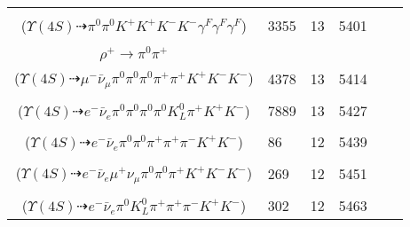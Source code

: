 \documentclass[landscape]{article}
\newcounter{rownumbers}
\newcommand\rn{\stepcounter{rownumbers}\arabic{rownumbers}}
\newcommand{\EOL}{\\} %
\newcommand{\topoTags}[1]{#1} %
\begin{document}
\begin{longtable}{clcccc}
\rn & \makecell[l]{ $ 
\Upsilon(4S) \rightarrow B^{0} B^{0} ,
B^{0} \rightarrow \pi^{0} K^{+} K^{-} \gamma^{F} ,
B^{0} \rightarrow \pi^{0} K^{+} K^{-} \gamma^{F} \gamma^{F} 
$ \\ ($
\Upsilon(4S) \dashrightarrow \pi^{0} \pi^{0} K^{+} K^{+} K^{-} K^{-} \gamma^{F} \gamma^{F} \gamma^{F} 
$) } & \topoTags{3355 & }13 & 5401 \EOL

\rn & \makecell[l]{ $ 
\Upsilon(4S) \rightarrow B^{0} \bar{B}^{0} ,
B^{0} \rightarrow \pi^{0} K^{+} K^{-} ,
\bar{B}^{0} \rightarrow \mu^{-} \bar{\nu}_{\mu} D^{*+} ,
D^{*+} \rightarrow \pi^{+} D^{0} ,
D^{0} \rightarrow K^{-} a_{1}^{+} ,
a_{1}^{+} \rightarrow \pi^{0} \rho^{+} ,
$ \\ $
\rho^{+} \rightarrow \pi^{0} \pi^{+} 
$ \\ ($
\Upsilon(4S) \dashrightarrow \mu^{-} \bar{\nu}_{\mu} \pi^{0} \pi^{0} \pi^{0} \pi^{+} \pi^{+} K^{+} K^{-} K^{-} 
$) } & \topoTags{4378 & }13 & 5414 \EOL

\rn & \makecell[l]{ $ 
\Upsilon(4S) \rightarrow B^{0} \bar{B}^{0} ,
B^{0} \rightarrow \pi^{0} K^{+} K^{-} ,
\bar{B}^{0} \rightarrow e^{-} \bar{\nu}_{e} D^{*+} ,
D^{*+} \rightarrow \pi^{+} D^{0} ,
D^{0} \rightarrow \pi^{0} \pi^{0} \pi^{0} K_{L}^{0} 
$ \\ ($
\Upsilon(4S) \dashrightarrow e^{-} \bar{\nu}_{e} \pi^{0} \pi^{0} \pi^{0} \pi^{0} K_{L}^{0} \pi^{+} K^{+} K^{-} 
$) } & \topoTags{7889 & }13 & 5427 \EOL

\rn & \makecell[l]{ $ 
\Upsilon(4S) \rightarrow B^{0} \bar{B}^{0} ,
B^{0} \rightarrow \pi^{0} K^{+} K^{-} ,
\bar{B}^{0} \rightarrow e^{-} \bar{\nu}_{e} D^{+} ,
D^{+} \rightarrow \pi^{0} \pi^{+} K_{S}^{0} ,
K_{S}^{0} \rightarrow \pi^{+} \pi^{-} 
$ \\ ($
\Upsilon(4S) \dashrightarrow e^{-} \bar{\nu}_{e} \pi^{0} \pi^{0} \pi^{+} \pi^{+} \pi^{-} K^{+} K^{-} 
$) } & \topoTags{86 & }12 & 5439 \EOL

\rn & \makecell[l]{ $ 
\Upsilon(4S) \rightarrow B^{0} \bar{B}^{0} ,
B^{0} \rightarrow \pi^{0} K^{+} K^{-} ,
\bar{B}^{0} \rightarrow e^{-} \bar{\nu}_{e} D^{*+} ,
D^{*+} \rightarrow \pi^{0} D^{+} ,
D^{+} \rightarrow \mu^{+} \nu_{\mu} \bar{K}^{*} ,
\bar{K}^{*} \rightarrow \pi^{+} K^{-} 
$ \\ ($
\Upsilon(4S) \dashrightarrow e^{-} \bar{\nu}_{e} \mu^{+} \nu_{\mu} \pi^{0} \pi^{0} \pi^{+} K^{+} K^{-} K^{-} 
$) } & \topoTags{269 & }12 & 5451 \EOL

\rn & \makecell[l]{ $ 
\Upsilon(4S) \rightarrow B^{0} \bar{B}^{0} ,
B^{0} \rightarrow \pi^{0} K^{+} K^{-} ,
\bar{B}^{0} \rightarrow e^{-} \bar{\nu}_{e} D^{*+} ,
D^{*+} \rightarrow \pi^{+} D^{0} ,
D^{0} \rightarrow K_{L}^{0} \pi^{+} \pi^{-} 
$ \\ ($
\Upsilon(4S) \dashrightarrow e^{-} \bar{\nu}_{e} \pi^{0} K_{L}^{0} \pi^{+} \pi^{+} \pi^{-} K^{+} K^{-} 
$) } & \topoTags{302 & }12 & 5463 \EOL


\end{longtable}
\end{document}
